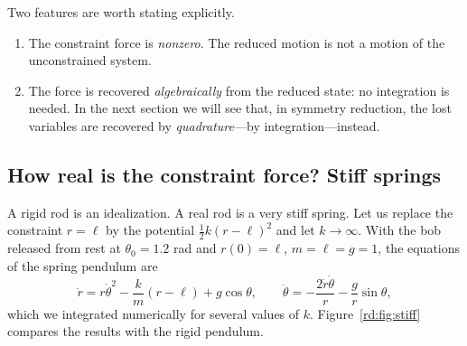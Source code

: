 Two features are worth stating explicitly.
\begin{enumerate}[label=(\alph*)]
\item The constraint force is \emph{nonzero}. The reduced motion is not a motion of the unconstrained system.
\item The force is recovered \emph{algebraically} from the reduced state: no integration is needed. In the next section we will see that, in symmetry reduction, the lost variables are recovered by \emph{quadrature}---by integration---instead.
\end{enumerate}

\subsection{How real is the constraint force? Stiff springs}\label{rd:sec:stiff}

A rigid rod is an idealization. A real rod is a very stiff spring. Let us replace the constraint $r=\ell$ by the potential $\tfrac12k(r-\ell)^2$ and let $k\to\infty$. With the bob released from rest at $\theta_0=1.2$ rad and $r(0)=\ell$, $m=\ell=g=1$, the equations of the spring pendulum are
\[
\ddot r=r\dot\theta^2-\frac km(r-\ell)+g\cos\theta,\qquad
\ddot\theta=-\frac{2\dot r\dot\theta}{r}-\frac gr\sin\theta ,
\]
which we integrated numerically for several values of $k$. Figure~\ref{rd:fig:stiff} compares the results with the rigid pendulum.

